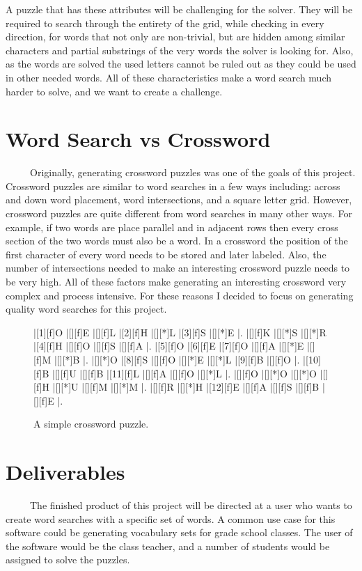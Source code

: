 \documentclass[12pt]{report}   %
\begin{document}
    A puzzle that has these attributes will be challenging for the solver. They
    will be required to search through the entirety of the grid, while checking
    in every direction, for words that not only are non-trivial, but are 
    hidden among similar characters and partial substrings of the very words
    the solver is looking for. Also, as the words are solved the used letters
    cannot be ruled out as they could be used in other needed words. All of
    these characteristics make a word search much harder to solve, and we want
    to create a challenge.


\section*{Word Search vs Crossword}
    \ \ \ \ \ Originally, generating crossword puzzles was one of the goals of
    this project. Crossword puzzles are similar to word searches in a few ways
    including: across and down word placement, word intersections, and a square
    letter grid. However, crossword puzzles are quite different from word
    searches in many other ways. For example, if two words are place parallel
    and in adjacent rows then every cross section of the two words must also be
    a word. In a crossword the position of the first character of every word
    needs to be stored and later labeled. Also, the number of intersections
    needed to make an interesting crossword puzzle needs to be very high. All
    of these factors make generating an interesting crossword very complex and
    process intensive. For these reasons I decided to focus on generating
    quality word searches for this project.

    \begin{figure}[h!]
        \begin{Puzzle}{7}{7}
            |[1][f]O |[][f]E |[][f]L |[2][f]H |[][*]L |[3][f]S |[][*]E |.
            |[][f]K |[][*]S |[][*]R |[4][f]H |[][f]O |[][f]S |[][f]A |.
            |[5][f]O |[6][f]E |[7][f]O |[][f]A |[][*]E |[][f]M |[][*]B |.
            |[][*]O |[8][f]S |[][f]O |[][*]E |[][*]L |[9][f]B |[][f]O |.
            |[10][f]B |[][f]U |[][f]B |[11][f]L |[][f]A |[][f]O |[][*]L |.
            |[][f]O |[][*]O |[][*]O |[][f]H |[][*]U |[][f]M |[][*]M |.
            |[][f]R |[][*]H |[12][f]E |[][f]A |[][f]S |[][f]B |[][f]E |.
        \end{Puzzle}
        \caption{A simple crossword puzzle.}
    \end{figure}


\section*{Deliverables}
    \ \ \ \ \ The finished product of this project will be directed at a user
    who wants to create word searches with a specific set of words. A common
    use case for this software could be generating vocabulary sets for grade 
    school classes. The user of the software would be the class teacher, and a
    number of students would be assigned to solve the puzzles.
\end{document}
